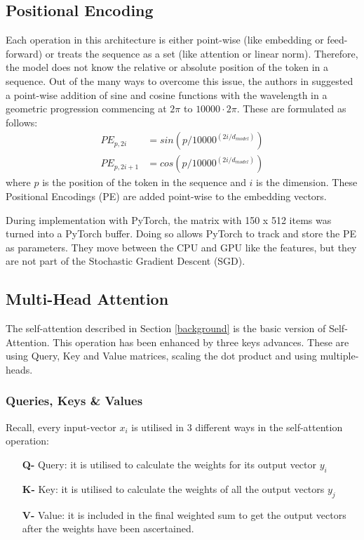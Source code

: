 \documentclass[12pt,a4paper,twoside,openright]{report}
\begin{document}
\subsection{Positional Encoding}
\label{pe}
Each operation in this architecture is either point-wise (like embedding or feed-forward) or treats the sequence as a set (like attention or linear norm). Therefore, the model does not know the relative or absolute position of the token in a sequence.  Out of the many ways to overcome this issue, the authors in\cite{transformers} suggested a point-wise addition of sine and cosine functions with the wavelength in a geometric progression commencing at $2\pi$ to $10000 \cdot 2\pi$. These are formulated as follows:
\begin{align*}
    PE_{p, 2i} &= sin(p / 10000 ^ {(2i/d_{model})})\\
    PE_{p, 2i+1} &= cos(p / 10000 ^ {(2i/d_{model})})
\end{align*}
where $p$ is the position of the token in the sequence and $i$ is the dimension. These Positional Encodings (PE) are added point-wise to the embedding vectors.

During implementation with PyTorch, the matrix with 150 x 512 items was turned into a PyTorch buffer. Doing so allows PyTorch to track and store the PE as parameters. They move between the CPU and GPU like the features, but they are not part of the Stochastic Gradient Descent (SGD).

\subsection{Multi-Head Attention}
\label{attention}

The self-attention described in Section \ref{background}  is the basic version of Self-Attention. This operation has been enhanced by three keys advances. These are using Query, Key and Value matrices, scaling the dot product and using multiple-heads.

\subsubsection{Queries, Keys \& Values}

Recall, every input-vector $x_i$ is utilised in 3 different ways in the self-attention operation:
\begin{itemize}
	\item[\textbf{Q-}] Query:  it is utilised to calculate the weights for its output vector $y_i$
	\item[\textbf{K-}] Key:  it is utilised to calculate the weights of all the output vectors $y_j$
	\item[\textbf{V-}] Value:  it is included in the final weighted sum to get the output vectors after the weights have been ascertained.
\end{itemize}
\end{document}
